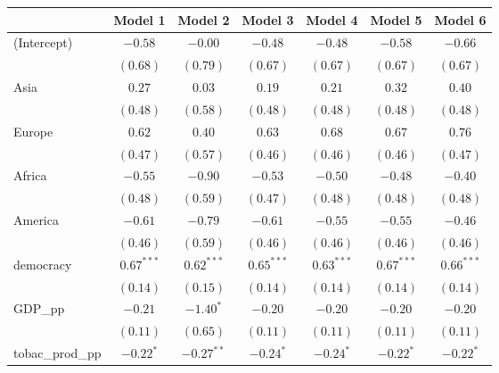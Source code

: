 
\begin{table}[!h]
\begin{center}
\begin{tabular}{l c c c c c c }
\toprule
 & Model 1 & Model 2 & Model 3 & Model 4 & Model 5 & Model 6 \\
\midrule
(Intercept)             & $-0.58$      & $-0.00$      & $-0.48$      & $-0.48$      & $-0.58$      & $-0.66$      \\
                        & $(0.68)$     & $(0.79)$     & $(0.67)$     & $(0.67)$     & $(0.67)$     & $(0.67)$     \\
Asia                    & $0.27$       & $0.03$       & $0.19$       & $0.21$       & $0.32$       & $0.40$       \\
                        & $(0.48)$     & $(0.58)$     & $(0.48)$     & $(0.48)$     & $(0.48)$     & $(0.48)$     \\
Europe                  & $0.62$       & $0.40$       & $0.63$       & $0.68$       & $0.67$       & $0.76$       \\
                        & $(0.47)$     & $(0.57)$     & $(0.46)$     & $(0.46)$     & $(0.46)$     & $(0.47)$     \\
Africa                  & $-0.55$      & $-0.90$      & $-0.53$      & $-0.50$      & $-0.48$      & $-0.40$      \\
                        & $(0.48)$     & $(0.59)$     & $(0.47)$     & $(0.48)$     & $(0.48)$     & $(0.48)$     \\
America                 & $-0.61$      & $-0.79$      & $-0.61$      & $-0.55$      & $-0.55$      & $-0.46$      \\
                        & $(0.46)$     & $(0.59)$     & $(0.46)$     & $(0.46)$     & $(0.46)$     & $(0.46)$     \\
democracy               & $0.67^{***}$ & $0.62^{***}$ & $0.65^{***}$ & $0.63^{***}$ & $0.67^{***}$ & $0.66^{***}$ \\
                        & $(0.14)$     & $(0.15)$     & $(0.14)$     & $(0.14)$     & $(0.14)$     & $(0.14)$     \\
GDP\_pp                 & $-0.21$      & $-1.40^{*}$  & $-0.20$      & $-0.20$      & $-0.20$      & $-0.20$      \\
                        & $(0.11)$     & $(0.65)$     & $(0.11)$     & $(0.11)$     & $(0.11)$     & $(0.11)$     \\
tobac\_prod\_pp         & $-0.22^{*}$  & $-0.27^{**}$ & $-0.24^{*}$  & $-0.24^{*}$  & $-0.22^{*}$  & $-0.22^{*}$  \\

\end{tabular}
\end{center}
\end{table}
